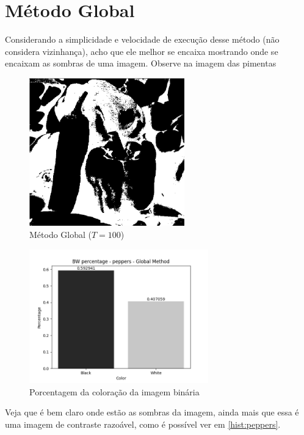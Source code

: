 \documentclass[12pt, letterpaper]{article}
\begin{document}
\section{Método Global}
    Considerando a simplicidade e velocidade de execução desse método (não considera vizinhança), acho que ele melhor se encaixa mostrando onde se encaixam as sombras de uma imagem. Observe na imagem das pimentas
    \begin{figure}[H]
        \centering
        \includegraphics[width=0.6\textwidth]{global_peppers.png}
        \\{Método Global ($T = 100$)}

        \includegraphics[width=0.69\textwidth]{global_peppers_bw_percentage.png}
        \\{Porcentagem da coloração da imagem binária}
    \end{figure}
    Veja que é bem claro onde estão as sombras da imagem, ainda mais que essa é uma imagem de contraste razoável, como é possível ver em \ref{hist:peppers}.
\end{document}
